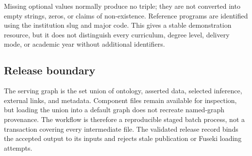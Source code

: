 Missing optional values normally produce no triple; they are not converted into empty strings,
zeros, or claims of non-existence. Reference programs are identified using the institution slug
and major code. This gives a stable demonstration resource, but it does not distinguish every
curriculum, degree level, delivery mode, or academic year without additional identifiers.

\subsection{Release boundary}
The serving graph is the set union of ontology, asserted data, selected inference, external
links, and metadata. Component files remain available for inspection, but loading the union
into a default graph does not recreate named-graph provenance. The workflow is therefore a
reproducible staged batch process, not a transaction covering every intermediate file. The
validated release record binds the accepted output to its inputs and rejects stale publication
or Fuseki loading attempts.
